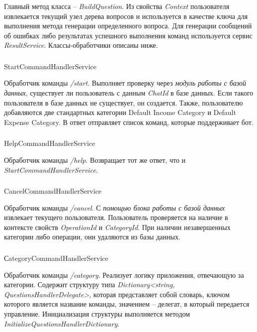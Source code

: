 Главный метод класса – \emph{BuildQuestion}. Из свойства \emph{Context} пользователя извлекается текущий узел дерева вопросов и используется в качестве ключа для выполнения метода генерации определенного вопроса.
Для генерации сообщений об ошибках либо результатах успешного выполнения команд используется сервис \emph{ResultService}.
Классы-обработчики описаны ниже.

\subsubsection{} StartCommandHandlerService
\label{sec:design:server:StartCommandHandlerService}

Обработчик команды \emph{/start}. Выполняет проверку через \emph{модуль работы с базой данных}, существует ли пользователь с данным \emph{ChatId} в базе данных. Если такого пользователя в базе данных не существует, он создается. Также, пользователю добавляются две стандартных категории Default Income Category и Default Expense Category. В ответ отправляет список команд, которые поддерживает бот.

\subsubsection{} HelpCommandHandlerService
\label{sec:design:server:HelpCommandHandlerService}

Обработчик команды \emph{/help}. Возвращает тот же ответ, что и \linebreak \emph{StartCommandHandlerService}.

\subsubsection{} CancelCommandHandlerService
\label{sec:design:server:CancelCommandHandlerService}

Обработчик команды \emph{/cancel}. С \emph{помощью блока работы с базой данных} извлекает текущего пользователя. Пользователь проверяется на наличие в контексте свойств \emph{OperationId} и \emph{CategoryId}. При наличии незавершенных категории либо операции, они удаляются из базы данных.

\subsubsection{} СategoryCommandHandlerService
\label{sec:design:server:СategoryCommandHandlerService}

Обработчик команды \emph{/category}. Реализует логику приложения, отвечающую за категории. Содержит структуру типа \emph{Dictionary<string, \linebreak QuestionsHandlerDelegate>}, которая представляет собой словарь, ключом которого является название команды, значением – делегат, в который передается управление.
Инициализация структуры выполняется методом \linebreak \emph{InitializeQuestionsHandlerDictionary}.

